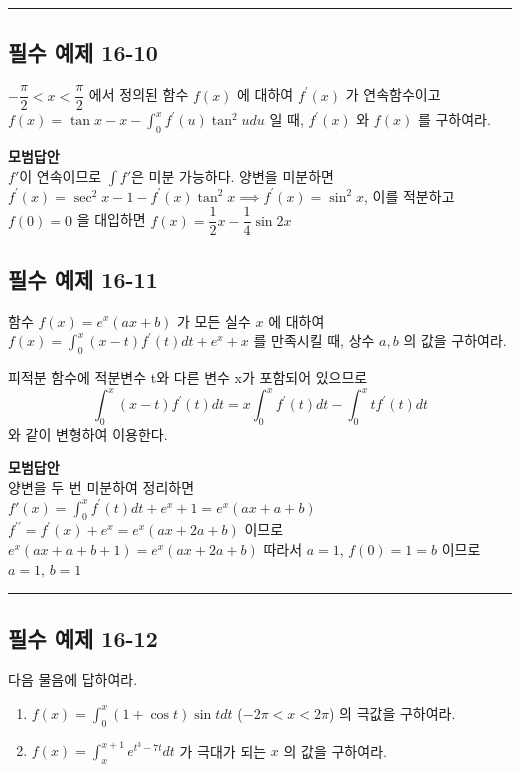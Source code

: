 \documentclass[a4paper,11pt]{article}
\begin{document}
\vspace{0.5cm}
\hrule
\vspace{0.5cm}

\subsection*{필수 예제 16-10}
$-\dfrac{\pi}{2} < x < \dfrac{\pi}{2}$ 에서 정의된 함수 $f(x)$ 에 대하여 $f^{\prime}(x)$ 가 연속함수이고 $f(x) = \tan x - x - \displaystyle \int_{0}^{x} f^{\prime}(u) \tan^2 u du$ 일 때, $f^{\prime}(x)$ 와 $f(x)$ 를 구하여라. 

\textbf{모범답안} \\
$f'$이 연속이므로 $\int f'$은 미분 가능하다. 양변을 미분하면 $f^{\prime}(x) = \sec^2 x - 1 - f^{\prime}(x) \tan^2 x \implies f^{\prime}(x) = \sin^2 x$, 이를 적분하고 $f(0)=0$ 을 대입하면 $f(x) =\dfrac{1}{2}x - \dfrac{1}{4}\sin 2x$ 

\subsection*{필수 예제 16-11}
함수 $f(x) = e^x(ax+b)$ 가 모든 실수 $x$ 에 대하여 $f(x) = \displaystyle \int_{0}^{x} (x-t)f^{\prime}(t) dt + e^x + x$ 를 만족시킬 때, 상수 $a, b$ 의 값을 구하여라. 

\begin{studybox}
피적분 함수에 적분변수 t와 다른 변수 x가 포함되어 있으므로 
\[\int_{0}^{x} (x-t)f^{\prime}(t) dt = x \int_0^x f^{\prime}(t) dt - \int_0^x t f^{\prime}(t) dt \]
와 같이 변형하여 이용한다.
\end{studybox}

\textbf{모범답안} \\
양변을 두 번 미분하여 정리하면 \\
$f'(x)=\int_{0}^{x}f^{\prime}(t)dt+e^x+1=e^x(ax+a+b)$\\
$f^{\prime \prime}= f^{\prime}(x)+e^x=e^x(ax+2a+b)$ 이므로\\
 $e^x(ax+a+b+1)=e^x(ax+2a+b)$ 따라서 $a=1$, $f(0)=1=b$ 이므로 $a=1$, $b=1$ 

\vspace{0.5cm}
\hrule
\vspace{0.5cm}

\subsection*{필수 예제 16-12}
다음 물음에 답하여라. 
\begin{enumerate}[label=(\arabic*)]
    \item $f(x) = \displaystyle \int_{0}^{x} (1+\cos t) \sin t dt$ ($-2\pi < x < 2\pi$) 의 극값을 구하여라.
    \item $f(x) = \displaystyle \int_{x}^{x+1} e^{t^3-7t} dt$ 가 극대가 되는 $x$ 의 값을 구하여라.
\end{enumerate}
\end{document}
